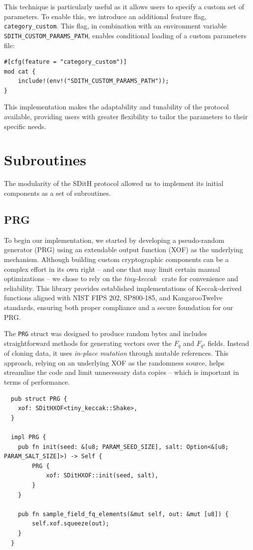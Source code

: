 \documentclass[11pt]{report}
\theoremstyle{definition}
\theoremstyle{plain}
\begin{document}
This technique is particularly useful as it allows users to specify a custom set of parameters. To enable this, we introduce an additional feature flag, \texttt{category\_custom}. This flag, in combination with an environment variable \texttt{SDITH\_CUSTOM\_PARAMS\_PATH}, enables conditional loading of a custom parameters file:

\begin{verbatim}
#[cfg(feature = "category_custom")]
mod cat {
    include!(env!("SDITH_CUSTOM_PARAMS_PATH"));
}
\end{verbatim}

This implementation makes the adaptability and tunability of the protocol available, providing users with greater flexibility to tailor the parameters to their specific needs.

\section{Subroutines}\label{sub:subroutines}
The modularity of the SDitH protocol allowed us to implement its initial components as a set of subroutines.

\subsection{PRG}\label{sub:prg}
To begin our implementation, we started by developing a pseudo-random generator (PRG) using an extendable output function (XOF) as the underlying mechanism. Although building custom cryptographic components can be a complex effort in its own right -- and one that may limit certain manual optimizations -- we chose to rely on the \textit{tiny-keccak}~\cite{tinykeccak} crate for convenience and reliability. This library provides established implementations of Keccak-derived functions aligned with NIST FIPS 202, SP800-185, and KangarooTwelve standards, ensuring both proper compliance and a secure foundation for our PRG.

The \texttt{PRG} struct was designed to produce random bytes and includes straightforward methods for generating vectors over the $F_q$ and $F_{q^4}$ fields. Instead of cloning data, it uses \emph{in-place mutation} through mutable references. This approach, relying on an underlying XOF as the randomness source, helps streamline the code and limit unnecessary data copies -- which is important in terms of performance.

\begin{verbatim}
  pub struct PRG {
    xof: SDitHXOF<tiny_keccak::Shake>,
  }

  impl PRG {
    pub fn init(seed: &[u8; PARAM_SEED_SIZE], salt: Option<&[u8; PARAM_SALT_SIZE]>) -> Self {
        PRG {
            xof: SDitHXOF::init(seed, salt),
        }
    }

    pub fn sample_field_fq_elements(&mut self, out: &mut [u8]) {
        self.xof.squeeze(out);
    }
  }
\end{verbatim}
\end{document}
